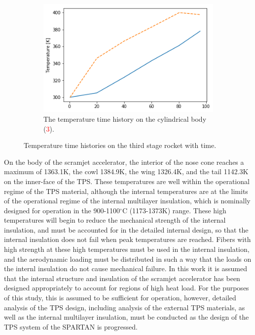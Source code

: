 \begin{figure}[!ht]
\begin{subfigure}{.495\textwidth}
	\end{subfigure}
	
	\begin{subfigure}{.495\textwidth}
		\centering
		\includegraphics[width=0.99\linewidth]{figures/A1_uncertainty-analysis/T3Body}
		\caption{The temperature time history on the cylindrical body (\textcolor{red}{3}).}
		
	\end{subfigure}
	
	\caption{Temperature time histories on the third stage rocket with time.}
	\label{fig:TrajTemp3}
\end{figure}

On the body of the scramjet accelerator, the interior of the nose cone reaches a maximum of 1363.1K, the cowl 1384.9K, the wing 1326.4K, and the tail 1142.3K on the inner-face of the TPS.
These temperatures are well within the operational regime of the TPS material, although the internal temperatures are at the limits of the operational regime of the internal multilayer insulation, which is nominally designed for operation in the 900-1100$^\circ$C (1173-1373K) range. These high temperatures will begin to reduce the mechanical strength of the internal insulation\cite{Kourtides}, and must be accounted for in the detailed internal design, so that the internal insulation does not fail when peak temperatures are reached. Fibers with high strength at these high temperatures must be used in the internal insulation, and the aerodynamic loading must be distributed in such a way that the loads on the internl insulation do not cause mechanical failure. In this work it is assumed that the internal structure and insulation of the scramjet accelerator has been designed appropriately to account for regions of high heat load. For the purposes of this study, this is assumed to be sufficient for operation, however, detailed analysis of the TPS design, including analysis of the external TPS materials, as well as the internal multilayer insulation, must be conducted as the design of the TPS system of the SPARTAN is progressed. 

